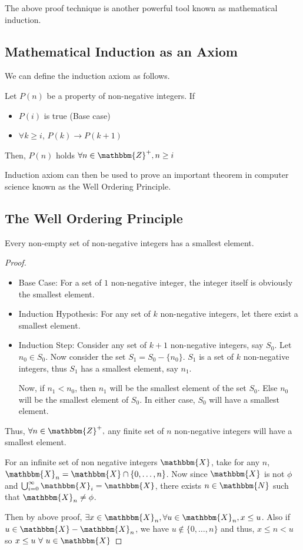 \documentclass[14pt]{extarticle}
\newcommand{\impl}{\xrightarrow{}}
\newcommand{\N}{\mathbbm{N}}
\newcommand{\Z}{\mathbbm{Z}}
\newcommand{\X}{\mathbbm{X}}
\begin{document}
The above proof technique is another powerful tool known as mathematical induction.
\newpage

\subsection{Mathematical Induction as an Axiom}

We can define the induction axiom as follows.

Let $P(n)$ be a property of non-negative integers. If
\begin{itemize}
    \item $P(i)$ is true (Base case)
    \item $\forall k\geq i$, $P(k) \impl P(k+1)$
\end{itemize}
Then, $P(n)$ holds $\forall n\in \Z^+, n\geq i$

Induction axiom can then be used to prove an important theorem in computer science known as the Well Ordering Principle.

\subsection{The Well Ordering Principle}

Every non-empty set of non-negative integers has a smallest element.

\begin{proof} \
    \begin{itemize}
        \item Base Case: For a set of $1$ non-negative integer, the integer itself is obviously the smallest element.

        \item Induction Hypothesis: For any set of $k$ non-negative integers, let there exist a smallest element.

        \item Induction Step: Consider any set of $k+1$ non-negative integers, say $S_0$. Let $n_0 \in S_0$. Now consider the set $S_1 = S_0-\{n_0\}$. $S_1$ is a set of $k$ non-negative integers, thus $S_1$ has a smallest element, say $n_1$.

        Now, if $n_1 < n_0$, then $n_1$ will be the smallest element of the set $S_0$. Else $n_0$ will be the smallest element of $S_0$. In either case, $S_0$ will have a smallest element.
    \end{itemize}

    Thus, $\forall n \in \Z^+,$ any finite set of $n$ non-negative integers will have a smallest element.

    For an infinite set of non negative integers $\X$, take for any $n$, $\X_n = \X \cap \{0, \dots, n\}$. Now since $\X$ is not $\phi$ and $\bigcup_{i=0}^\infty \X_i = \X$, there exists $n \in \N$ such that $\X_n \neq \phi$.

    Then by above proof, $\exists x \in \X_n, \forall u \in \X_n, x \leq u$. Also if $u \in \X - \X_n$, we have $u \notin \{0, \dots, n\}$ and thus, $x \leq n < u$ so $x \leq u \ \forall \ u \in \X$
\end{proof}
\end{document}
